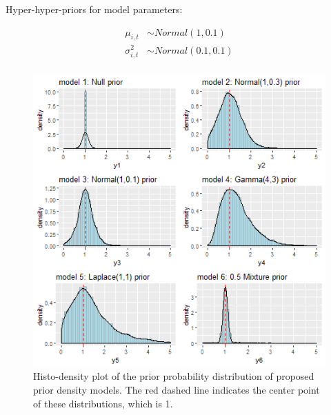 Hyper-hyper-priors for model parameters:

\begin{equation*} \label{Poissonm6d}
\begin{aligned}
\mu_{i,t} & \sim Normal(1,0.1)\\
\sigma^2_{i,t} &\sim Normal(0.1,0.1)\\
\end{aligned}
\end{equation*}

\newpage
\begin{figure}[!h]
	\centering
	\includegraphics[width=1\linewidth]{../../R-codes/JAGS/plots/priordist}
	\caption{Histo-density plot of the prior probability distribution of proposed prior density models. The red dashed line indicates the center point of these distributions, which is 1.}
	\label{fig:priordist2}
\end{figure}

